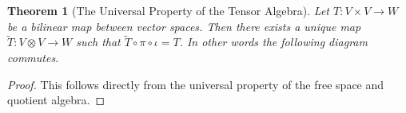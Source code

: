 \documentclass[12pt]{extarticle}
\newtheorem*{theorem}{Theorem}
\newcommand{\freespace}[1] {{\F\langle #1 \rangle}}
\renewcommand{\to}[0]{\longrightarrow}
\newcommand{\F}{{\mathbb{F}}}
\begin{document}
\begin{theorem}[The Universal Property of the Tensor Algebra]
  Let $T : V \times V \to W$ be a bilinear map between vector spaces. Then there exists a unique map $\tilde{T} : V \otimes V \to W$ such that $\tilde{T} \circ \pi \circ \iota = T$. In other words the following diagram commutes. 
    \begin{center}
  \end{center}
\end{theorem}

\begin{proof}
  This follows directly from the universal property of the free space and quotient algebra.
\end{proof}
\end{document}
